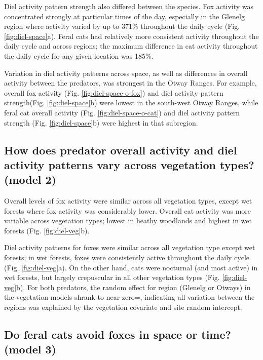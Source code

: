 \documentclass[]{elsarticle} %
\begin{document}
Diel activity pattern strength also differed between the species. Fox activity was concentrated strongly at particular times of the day, especially in the Glenelg region where activity varied by up to 371\% throughout the daily cycle (Fig. \ref{fig:diel-space}a). Feral cats had relatively more consistent activity throughout the daily cycle and across regions; the maximum difference in cat activity throughout the daily cycle for any given location was 185\%.

Variation in diel activity patterns across space, as well as differences in overall activity between the predators, was strongest in the Otway Ranges. For example, overall fox activity (Fig. \ref{fig:diel-space-o-fox}) and diel activity pattern strength(Fig. \ref{fig:diel-space}b) were lowest in the south-west Otway Ranges, while feral cat overall activity (Fig. \ref{fig:diel-space-o-cat}) and diel activity pattern strength (Fig. \ref{fig:diel-space}b) were highest in that subregion.

\hypertarget{how-does-predator-overall-activity-and-diel-activity-patterns-vary-across-vegetation-types-model-2-1}{%
\subsection{How does predator overall activity and diel activity patterns vary across vegetation types? (model 2)}\label{how-does-predator-overall-activity-and-diel-activity-patterns-vary-across-vegetation-types-model-2-1}}

Overall levels of fox activity were similar across all vegetation types, except wet forests where fox activity was considerably lower. Overall cat activity was more variable across vegetation types; lowest in heathy woodlands and highest in wet forests (Fig. \ref{fig:diel-veg}b).

Diel activity patterns for foxes were similar across all vegetation type except wet forests; in wet forests, foxes were consistently active throughout the daily cycle (Fig. \ref{fig:diel-veg}a). On the other hand, cats were nocturnal (and most active) in wet forests, but largely crepuscular in all other vegetation types (Fig. \ref{fig:diel-veg}b). For both predators, the random effect for region (Glenelg or Otways) in the vegetation models shrank to near-zero=, indicating all variation between the regions was explained by the vegetation covariate and site random intercept.

\hypertarget{do-feral-cats-avoid-foxes-in-space-or-time-model-3-1}{%
\subsection{Do feral cats avoid foxes in space or time? (model 3)}\label{do-feral-cats-avoid-foxes-in-space-or-time-model-3-1}}
\end{document}
